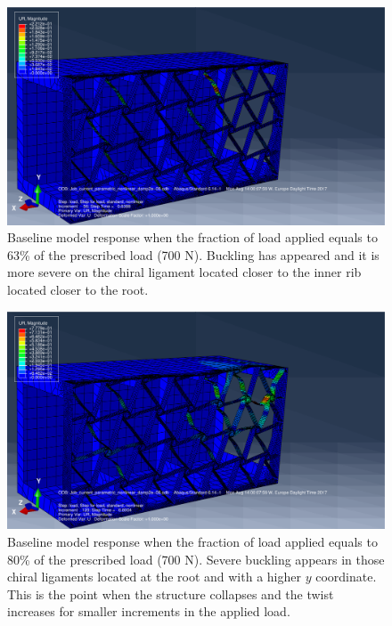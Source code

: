   \begin{figure}[!htpb] %
    \centering
    \includegraphics[width=0.8 \textwidth]{../figures/result-sim/1-UR}
    \caption[Baseline model response when the fraction of load applied equals to 63\% of the prescribed load (700 N)]{Baseline model response when the fraction of load applied equals to 63\% of the prescribed load (700 N). Buckling has appeared and it is more severe on the chiral ligament located closer to the inner rib located closer to the root.}\label{fig:1-UR}
  \end{figure}

  \begin{figure}[!htpb] %
    \centering
    \includegraphics[width=0.8 \textwidth]{../figures/result-sim/2-UR}
    \caption[Baseline model response when the fraction of load applied equals to 80\% of the prescribed load (700 N)]{Baseline model response when the fraction of load applied equals to 80\% of the prescribed load (700 N). Severe buckling appears in those chiral ligaments located at the root and with a higher $y$ coordinate. This is the point when the structure collapses and the twist increases for smaller increments in the applied load.}\label{fig:2-UR}
  \end{figure}

